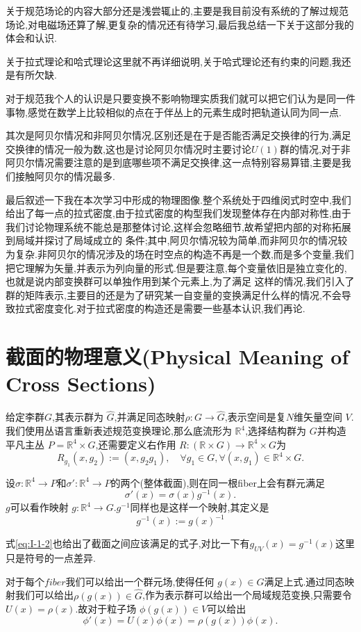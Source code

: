 \documentclass[../main.tex]{subfiles}
\begin{document}
 \begin{note}
 关于规范场论的内容大部分还是浅尝辄止的,主要是我目前没有系统的了解过规范场论,对电磁场还算了解,更复杂的情况还有待学习,最后我总结一下关于这部分我的体会和认识.

 关于拉式理论和哈式理论这里就不再详细说明,关于哈式理论还有约束的问题,我还是有所欠缺.

 对于规范我个人的认识是只要变换不影响物理实质我们就可以把它们认为是同一件事物,感觉在数学上比较相似的点在于伴丛上的元素生成时把轨道认同为同一点.

 其次是阿贝尔情况和非阿贝尔情况,区别还是在于是否能否满足交换律的行为,满足交换律的情况一般为数,这也是讨论阿贝尔情况时主要讨论$U(1)$群的情况,对于非阿贝尔情况需要注意的是到底哪些项不满足交换律,这一点特别容易算错,主要是我们接触阿贝尔的情况最多.

 最后叙述一下我在本次学习中形成的物理图像.整个系统处于四维闵式时空中,我们给出了每一点的拉式密度,由于拉式密度的构型我们发现整体存在内部对称性,由于我们讨论物理系统不能总是那整体讨论,这样会忽略细节,故希望把内部的对称拓展到局域并探讨了局域成立的
 条件;其中,阿贝尔情况较为简单,而非阿贝尔的情况较为复杂.非阿贝尔的情况涉及的场在时空点的构造不再是一个数,而是多个变量,我们把它理解为矢量,并表示为列向量的形式.但是要注意,每个变量依旧是独立变化的,也就是说内部变换群可以单独作用到某个元素上,为了满足
 这样的情况,我们引入了群的矩阵表示,主要目的还是为了研究某一自变量的变换满足什么样的情况,不会导致拉式密度变化.对于拉式密度的构造还是需要一些基本认识,我们再论.
 \end{note}
\chapter{截面的物理意义(Physical Meaning of Cross Sections)}
给定李群$G$,其表示群为 $\hat{G}$,并满足同态映射$\rho:G\to \hat{G}$,表示空间是复$N$维矢量空间 $V$.我们使用丛语言重新表述规范变换理论,那么底流形为 $\mathbb{R}^4$,选择结构群为 $G$并构造平凡主丛 $P = \mathbb{R}^4 \times G$,还需要定义右作用 $R: (\mathbb{R} \times G) \to \mathbb{R}^4 \times G$为\[
  R_{g_1}(x,g_2):=(x,g_2g_1),\quad \forall g_1 \in G,\forall (x,g_1)\in \mathbb{R}^4\times G
.\] 

设$\sigma: \mathbb{R}^4\to P$和$\sigma': \mathbb{R}^4 \to P$的两个(整体截面),则在同一根fiber上会有群元满足\[
  \sigma'(x)= \sigma(x)g^{-1}(x) 
.\]
$g$可以看作映射 $g:\mathbb{R}^4\to G$.$g^{-1}$同样也是这样一个映射,其定义是
\begin{equation}
  \label{eq:I-6-1}
  g^{-1}(x):= g(x)^{-1}
\end{equation}
\begin{note}
式\ref{eq:I-1-2}也给出了截面之间应该满足的式子,对比一下有$g_{UV}(x) = g^{-1}(x)$这里只是符号的一点差异.
\end{note}
对于每个$fiber$我们可以给出一个群元场,使得任何 $g(x)\in G$满足上式.通过同态映射我们可以给出$\rho(g(x)) \in \hat{G}$,作为表示群可以给出一个局域规范变换,只需要令$U(x) = \rho(x)$.故对于粒子场 $\phi(g(x)) \in V$可以给出\[
\phi'(x) = U(x)\phi(x) = \rho(g(x))\phi(x)
.\] 
\end{document}
